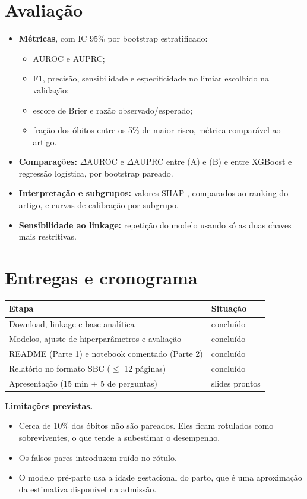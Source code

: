 \documentclass[12pt]{article}
\begin{document}
\section{Avaliação}

\begin{itemize}
  \item \textbf{Métricas}, com IC 95\% por bootstrap estratificado:
    \begin{itemize}
      \item AUROC e AUPRC;
      \item F1, precisão, sensibilidade e especificidade no limiar escolhido na validação;
      \item escore de Brier e razão observado/esperado;
      \item fração dos óbitos entre os 5\% de maior risco, métrica comparável ao artigo.
    \end{itemize}
  \item \textbf{Comparações:} $\Delta$AUROC e $\Delta$AUPRC entre (A) e (B) e entre XGBoost e regressão logística, por bootstrap pareado.
  \item \textbf{Interpretação e subgrupos:} valores SHAP \cite{lundberg2017}, comparados ao ranking do artigo, e curvas de calibração por subgrupo.
  \item \textbf{Sensibilidade ao linkage:} repetição do modelo usando só as duas chaves mais restritivas.
\end{itemize}

\section{Entregas e cronograma}

\begin{center}
\begin{tabular}{ll}
\toprule
Etapa & Situação \\
\midrule
Download, linkage e base analítica & concluído \\
Modelos, ajuste de hiperparâmetros e avaliação & concluído \\
README (Parte 1) e notebook comentado (Parte 2) & concluído \\
Relatório no formato SBC ($\leq$ 12 páginas) & concluído \\
Apresentação (15 min + 5 de perguntas) & slides prontos \\
\bottomrule
\end{tabular}
\end{center}

\textbf{Limitações previstas.}
\begin{itemize}
  \item Cerca de 10\% dos óbitos não são pareados. Eles ficam rotulados como sobreviventes, o que tende a subestimar o desempenho.
  \item Os falsos pares introduzem ruído no rótulo.
  \item O modelo pré-parto usa a idade gestacional do parto, que é uma aproximação da estimativa disponível na admissão.
\end{itemize}



\end{document}
